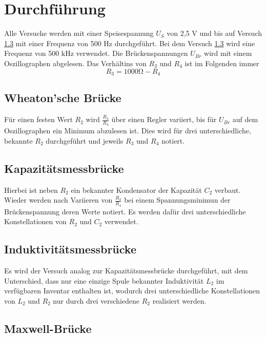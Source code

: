 \section{Durchführung}
\label{sec:Durchführung}

Alle Versuche werden mit einer Speisespannung $U_S$ von 2,5 \si{\volt} und bis auf Versuch \ref{sec:Induktivitätsmessbrücke} mit einer Frequenz von 500 \si{\hertz}
durchgeführt. Bei dem Versuch \ref{sec:Induktivitätsmessbrücke} wird eine Frequenz von 500 \si{\kilo\hertz} verwendet. Die Brückenspannungen $U_{Br}$ wird mit einem Oszillographen abgelesen. Das Verhältins von 
$R_3$ und $R_4$ ist im Folgenden immer \begin{equation}
    R_3 = 1000\si{\ohm} - R_4
\end{equation}

\subsection{Wheaton'sche Brücke}

Für einen festen Wert $R_2$ wird $\frac{R_3}{R_4}$ über einen Regler variiert, bis für $U_{Br}$ auf dem 
Oszillographen ein Minimum abzulesen ist. Dies wird für drei unterschiedliche, bekannte $R_2$ 
durchgeführt und jeweils $R_3$ und $R_4$ notiert. 

\subsection{Kapazitätsmessbrücke}

Hierbei ist neben $R_2$ ein bekannter Kondensator der Kapazität $C_2$ verbaut. 
Wieder werden nach Variieren von $\frac{R_3}{R_4}$ bei einem Spannungsminimun der
Brückenspannung deren Werte notiert. Es werden dafür drei unterschiedliche Konstellationen
von $R_2$ und $C_2$ verwendet. 

\subsection{Induktivitätsmessbrücke}
\label{sec:Induktivitätsmessbrücke}
Es wird der Versuch analog zur Kapazitätsmessbrücke durchgeführt, mit dem Unterschied, 
dass nur eine einzige Spule bekannter Induktivität $L_2$ im verfügbaren Inventar enthalten ist,
wodurch drei unterschiedliche Konstellationen von $L_2$ und $R_2$ nur durch drei verschiedene 
$R_2$ realisiert werden.

\subsection{Maxwell-Brücke}

